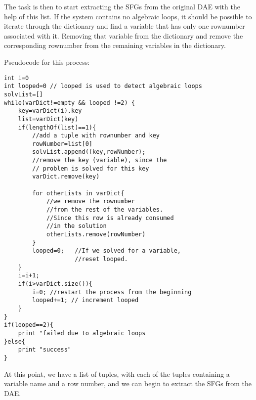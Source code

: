 The task is then to start extracting the SFGs from the original DAE with the help of this list. If the system contains no algebraic loops, it should be possible to iterate through the dictionary and find a variable that has only one rownumber associated with it. Removing that variable from the dictionary and remove the corresponding rownumber from the remaining variables in the dictionary.

Pseudocode for this process:
\begin{lstlisting}
int i=0
int looped=0 // looped is used to detect algebraic loops
solvList=[]
while(varDict!=empty && looped !=2) {
	key=varDict(i).key
	list=varDict(key)
	if(lengthOf(list)==1){
		//add a tuple with rownumber and key
		rowNumber=list[0]
		solvList.append((key,rowNumber);
		//remove the key (variable), since the
		// problem is solved for this key
		varDict.remove(key)
		
		for otherLists in varDict{
			//we remove the rownumber 
			//from the rest of the variables.
			//Since this row is already consumed
			//in the solution
			otherLists.remove(rowNumber)
		}
		looped=0; 	//If we solved for a variable, 
					//reset looped.
	}
	i=i+1;
	if(i>varDict.size()){
		i=0; //restart the process from the beginning
		looped+=1; // increment looped 	
	}			
}
if(looped==2){
	print "failed due to algebraic loops
}else{
	print "success"
}

\end{lstlisting}

At this point, we have a list of tuples, with each of the tuples containing a variable name and a row number, and we can begin to extract the SFGs from the DAE.